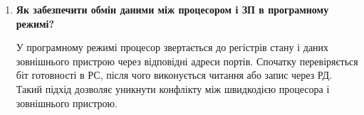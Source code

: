 \documentclass[12pt,a4paper]{article}
\begin{document}
\begin{enumerate}
    Директива \texttt{ORG} задає адресу розміщення мікрокоманд, \texttt{DW}
    використовується для ініціалізації комірок пам'яті, \texttt{ACCEPT} задає
    початковий стан регістрів, пам'яті та зовнішніх пристроїв, а \texttt{LINK}
    визначає конфігурацію зв'язків між шинами, регістрами та входами ПМК.

    \item \textbf{Як забезпечити обмін даними між процесором і ЗП в програмному режимі?}

    У програмному режимі процесор звертається до регістрів стану і даних зовнішнього
    пристрою через відповідні адреси портів. Спочатку перевіряється біт готовності в
    РС, після чого виконується читання або запис через РД. Такий підхід дозволяє
    уникнути конфлікту між швидкодією процесора і зовнішнього пристрою.
\end{enumerate}
\end{document}
